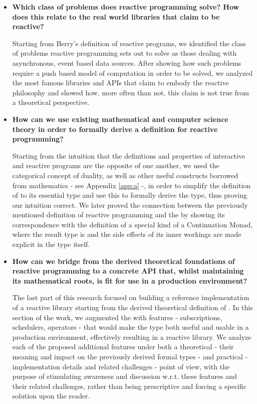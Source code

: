 \begin{itemize}
\item \textbf{Which class of problems does reactive programming solve? How does this relate to the real world libraries that claim to be reactive?}

Starting from Berry's definition of reactive programs\cite{berry1991reactive}, we identified the class of problems reactive programming sets out to solve as those dealing with asynchronous, event based data sources. After showing how such problems require a push based model of computation in order to be solved, we analyzed the most famous libraries and APIs that claim to embody the reactive philosophy and showed how, more often than not, this claim is not true from a theoretical perspective. 

\item \textbf{How can we use existing mathematical and computer science theory in order to formally derive a definition for reactive programming?}

Starting from the intuition that the definitions and properties of interactive and reactive programs are the opposite of one another, we used the categorical concept of duality, as well as other useful constructs borrowed from mathematics - see Appendix \ref{app:a} -, in order to simplify the definition of  to its essential type and use this to formally derive the  type, thus proving our intuition correct.
We later proved the connection between the previously mentioned definition of reactive programming and the  by showing its correspondence with the definition of a special kind of a Continuation Monad, where the result type is  and the side effects of its inner workings are made explicit in the type itself.

\item \textbf{How can we bridge from the derived theoretical foundations of reactive programming to a concrete API that, whilst maintaining its mathematical roots, is fit for use in a production environment?}

The last part of this research focused on building a reference implementation of a reactive library starting from the derived theoretical definition of . In this section of the work, we augmented the  with features - subscriptions, schedulers, operators - that would make the type both useful and usable in a production environment, effectively resulting in a reactive library. We analyze each of the proposed additional features under both a theoretical - their meaning and impact on the previously derived formal types - and practical - implementation details and related challenges - point of view, with the purpose of stimulating awareness and discussion w.r.t. these features and their related challenges, rather than being prescriptive and forcing a specific solution upon the reader.

\end{itemize}

